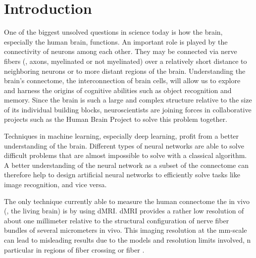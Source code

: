 \newpage\null\thispagestyle{empty}\newpage
\clearpage{\thispagestyle{empty}\cleardoublepage}
\cleardoublepage
% 
% 
% 
\setcounter{chapter}{0}
\chapter{Introduction}
\label{sec:intro}
% 
One of the biggest unsolved questions in science today is how the brain, especially the human brain, functions.
An important role is played by the connectivity of neurons among each other.
They may be connected via nerve fibers (\ie{}, axons, myelinated or not myelinated) over a relatively short distance to neighboring neurons or to more distant regions of the brain.
Understanding the brain's connectome, the interconnection of brain cells, will allow us to explore and harness the origins of cognitive abilities such as object recognition and memory.
Since the brain is such a large and complex structure relative to the size of its individual building blocks, neuroscientists are joining forces in collaborative projects such as the Human Brain Project to solve this problem together.\\
\cite{Markram2006, Shen2012, Amunts2013, Amunts2016}
\par
% 
Techniques in machine learning, especially deep learning, profit from a better understanding of the brain.
Different types of neural networks are able to solve difficult problems that are almost impossible to solve with a classical algorithm.
A better understanding of the neural network as a subset of the connectome can therefore help to design artificial neural networks to efficiently solve tasks like image recognition, and vice versa. \\
\cite{murphy2013machine, Goodfellow-et-al-2016}
\par
% 
The only technique currently able to measure the human connectome the in vivo (\ie{}, the living brain) is by using \ac{dMRI}.
\ac{dMRI} provides a rather low resolution of about one millimeter relative to the structural configuration of nerve fiber bundles of several micrometers in vivo.
This imaging resolution at the \si{\milli\meter}-scale can lead to misleading results due to the models and resolution limits involved, n particular in regions of fiber crossing or fiber  \cite{MaierHein2017}. 
